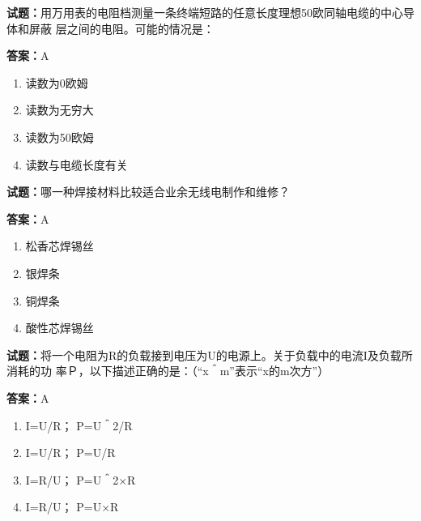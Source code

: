 \documentclass{ctexbook}
\begin{document}




\vspace{1em}

\textbf{试题：}用万用表的电阻档测量一条终端短路的任意长度理想50欧同轴电缆的中心导体和屏蔽
层之间的电阻。可能的情况是： 

\textbf{答案：}A 

\begin{enumerate}[leftmargin=3em]
  \item 读数为0欧姆 

  \item 读数为无穷大 

  \item 读数为50欧姆 

  \item 读数与电缆长度有关 

\end{enumerate}





\vspace{1em}

\textbf{试题：}哪一种焊接材料比较适合业余无线电制作和维修？ 

\textbf{答案：}A 

\begin{enumerate}[leftmargin=3em]
  \item 松香芯焊锡丝 

  \item 银焊条 

  \item 铜焊条 

  \item 酸性芯焊锡丝 

\end{enumerate}





\vspace{1em}

\textbf{试题：}将一个电阻为R的负载接到电压为U的电源上。关于负载中的电流I及负载所消耗的功
率Ｐ，以下描述正确的是：（“x＾m”表示“x的m次方”） 

\textbf{答案：}A 

\begin{enumerate}[leftmargin=3em]
  \item I=U/R； P=U＾2/R 


  \item I=U/R； P=U/R 

  \item I=R/U； P=U＾2×R 

  \item I=R/U； P=U×R 

\end{enumerate}
\end{document}
